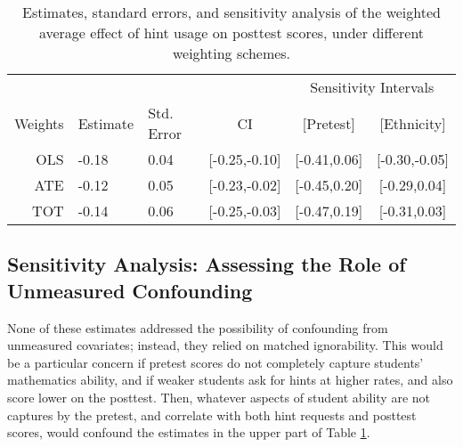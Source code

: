 \documentclass{article}\usepackage[]{graphicx}\usepackage[]{color}
\begin{document}
\begin{table}[ht]
\centering
\begin{tabular}{rllccc}
  \hline
  &&&&\multicolumn{2}{c}{Sensitivity Intervals}\\
 Weights&Estimate&Std. Error&CI&[Pretest]&[Ethnicity] \\
 \hline
OLS & -0.18 & 0.04 & [-0.25,-0.10] & [-0.41,0.06] & [-0.30,-0.05] \\ 
  ATE & -0.12 & 0.05 & [-0.23,-0.02] & [-0.45,0.20] & [-0.29,0.04] \\ 
  TOT & -0.14 & 0.06 & [-0.25,-0.03] & [-0.47,0.19] & [-0.31,0.03] \\ 
   \hline
\end{tabular}
\caption{Estimates, standard errors, and sensitivity analysis of the weighted average effect of hint usage on posttest scores, under different weighting schemes.} 
\label{tab:matchResults}
\end{table}



\subsection{Sensitivity Analysis: Assessing the Role of Unmeasured Confounding}

None of these estimates addressed the possibility of confounding from
unmeasured covariates; instead, they relied on matched ignorability.
This would be a particular concern if pretest scores do not completely
capture students' mathematics ability, and if weaker students ask for hints at
higher rates, and also score lower on the posttest.
Then, whatever aspects of student ability are not captures by the
pretest, and correlate with both hint requests and posttest scores,
would confound the estimates in the upper part of Table
\ref{tab:matchResults}.
\end{document}
